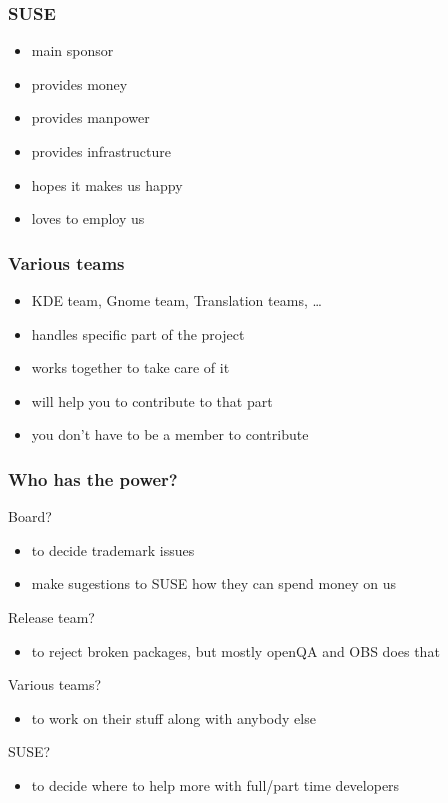 \documentclass{beamer}
\begin{document}
\begin{frame}[t]
\frametitle{SUSE}
\begin{itemize}
\item main sponsor
\item provides money
\item provides manpower
\item provides infrastructure
\item hopes it makes us happy
\item loves to employ us
\end{itemize}
\end{frame}

\begin{frame}[t]
\frametitle{Various teams}
\begin{itemize}
\item KDE team, Gnome team, Translation teams, \dots
\item handles specific part of the project
\item works together to take care of it
\item will help you to contribute to that part
\item you don't have to be a member to contribute
\end{itemize}
\end{frame}

\begin{frame}[t]
\frametitle{Who has the power?}
Board?
\pause
\begin{itemize}
\item to decide trademark issues
\item make sugestions to SUSE how they can spend money on us
\end{itemize}
\pause
Release team?
\pause
\begin{itemize}
\item to reject broken packages, but mostly openQA and OBS does that
\end{itemize}
\pause
Various teams?
\pause
\begin{itemize}
\item to work on their stuff along with anybody else
\end{itemize}
\pause
SUSE?
\pause
\begin{itemize}
\item to decide where to help more with full/part time developers
\end{itemize}
\end{frame}
\end{document}
